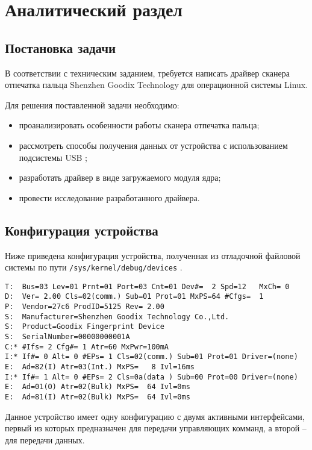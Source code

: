 \chapter{Аналитический раздел}

\section{Постановка задачи}

В соответствии с техническим заданием, требуется написать драйвер сканера отпечатка пальца Shenzhen Goodix Technology \cite{goodix} для операционной системы Linux.

Для решения поставленной задачи необходимо:

\begin{itemize}[label=---]
    \item проанализировать особенности работы сканера отпечатка пальца;
    \item рассмотреть способы получения данных от устройства с использованием подсистемы USB \cite{USB};
    \item разработать драйвер в виде загружаемого модуля ядра;
    \item провести исследование разработанного драйвера.
\end{itemize}

\section{Конфигурация устройства}

Ниже приведена конфигурация устройства, полученная из отладочной файловой системы по пути \texttt{/sys/kernel/debug/devices} \cite{sysfs}.

\begin{verbatim}
T:  Bus=03 Lev=01 Prnt=01 Port=03 Cnt=01 Dev#=  2 Spd=12   MxCh= 0
D:  Ver= 2.00 Cls=02(comm.) Sub=01 Prot=01 MxPS=64 #Cfgs=  1
P:  Vendor=27c6 ProdID=5125 Rev= 2.00
S:  Manufacturer=Shenzhen Goodix Technology Co.,Ltd.
S:  Product=Goodix Fingerprint Device
S:  SerialNumber=00000000001A
C:* #Ifs= 2 Cfg#= 1 Atr=60 MxPwr=100mA
I:* If#= 0 Alt= 0 #EPs= 1 Cls=02(comm.) Sub=01 Prot=01 Driver=(none)
E:  Ad=82(I) Atr=03(Int.) MxPS=   8 Ivl=16ms
I:* If#= 1 Alt= 0 #EPs= 2 Cls=0a(data ) Sub=00 Prot=00 Driver=(none)
E:  Ad=01(O) Atr=02(Bulk) MxPS=  64 Ivl=0ms
E:  Ad=81(I) Atr=02(Bulk) MxPS=  64 Ivl=0ms
\end{verbatim}

Данное устройство имеет одну конфигурацию с двумя активными интерфейсами, первый из которых предназначен для передачи управляющих комманд, а второй -- для передачи данных.

